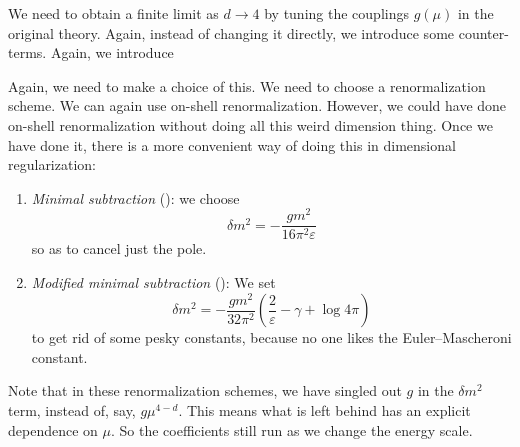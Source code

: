\documentclass[a4paper]{article}
\begin{document}
We need to obtain a finite limit as $d \to 4$ by tuning the couplings $g(\mu)$ in the original theory. Again, instead of changing it directly, we introduce some counter-terms. Again, we introduce
\begin{center}
\end{center}
Again, we need to make a choice of this. We need to choose a renormalization scheme. We can again use on-shell renormalization. However, we could have done on-shell renormalization without doing all this weird dimension thing. Once we have done it, there is a more convenient way of doing this in dimensional regularization:
\begin{enumerate}
  \item \emph{Minimal subtraction} (): we choose
    \[
      \delta m^2 = - \frac{gm^2}{16\pi^2\varepsilon}
    \]
    so as to cancel just the pole.
  \item \emph{Modified minimal subtraction} (): We set
    \[
      \delta m^2 = - \frac{gm^2}{32\pi^2} \left(\frac{2}{\varepsilon} - \gamma + \log 4\pi\right)
    \]
    to get rid of some pesky constants, because no one likes the Euler--Mascheroni constant.
\end{enumerate}
Note that in these renormalization schemes, we have singled out $g$ in the $\delta m^2$ term, instead of, say, $g \mu^{4 - d}$. This means what is left behind has an explicit dependence on $\mu$. So the coefficients still run as we change the energy scale.
\end{document}
